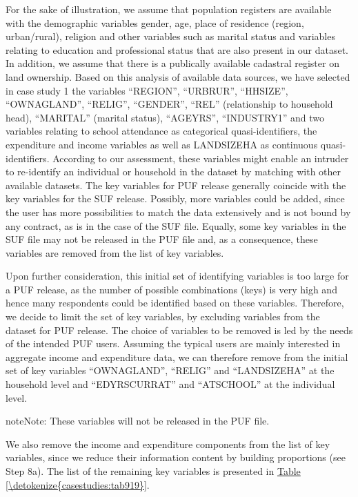 \documentclass[letterpaper,10pt,english]{sphinxmanual}
\begin{document}
For the sake of illustration, we assume that population registers are
available with the demographic variables gender, age, place of residence
(region, urban/rural), religion and other variables such as marital
status and variables relating to education and professional status that
are also present in our dataset. In addition, we assume that there is a
publically available cadastral register on land ownership. Based on this
analysis of available data sources, we have selected in case study 1 the
variables “REGION”, “URBRUR”, “HHSIZE”, “OWNAGLAND”, “RELIG”, “GENDER”,
“REL” (relationship to household head), “MARITAL” (marital status),
“AGEYRS”, “INDUSTRY1” and two variables relating to school attendance as
categorical quasi-identifiers, the expenditure and income variables as
well as LANDSIZEHA as continuous quasi-identifiers. According to our
assessment, these variables might enable an intruder to re-identify an
individual or household in the dataset by matching with other available
datasets. The key variables for PUF release generally coincide with the
key variables for the SUF release. Possibly, more variables could be
added, since the user has more possibilities to match the data
extensively and is not bound by any contract, as is in the case of the
SUF file. Equally, some key variables in the SUF file may not be
released in the PUF file and, as a consequence, these variables are
removed from the list of key variables.

Upon further consideration, this initial set of identifying variables is
too large for a PUF release, as the number of possible combinations
(keys) is very high and hence many respondents could be identified based
on these variables. Therefore, we decide to limit the set of key
variables, by excluding variables from the dataset for PUF release. The
choice of variables to be removed is led by the needs of the intended
PUF users. Assuming the typical users are mainly interested in aggregate
income and expenditure data, we can therefore remove from the initial
set of key variables “OWNAGLAND”, “RELIG” and “LANDSIZEHA” at the
household level and “EDYRSCURRAT” and “ATSCHOOL” at the individual
level.

\begin{sphinxadmonition}{note}{Note:}
These variables will not be released in the PUF file.
\end{sphinxadmonition}

We also remove the income and expenditure components from the list of
key variables, since we reduce their information content by building
proportions (see Step 8a). The list of the remaining key variables is
presented in \hyperref[\detokenize{casestudies:tab919}]{Table \ref{\detokenize{casestudies:tab919}}}.
\end{document}
